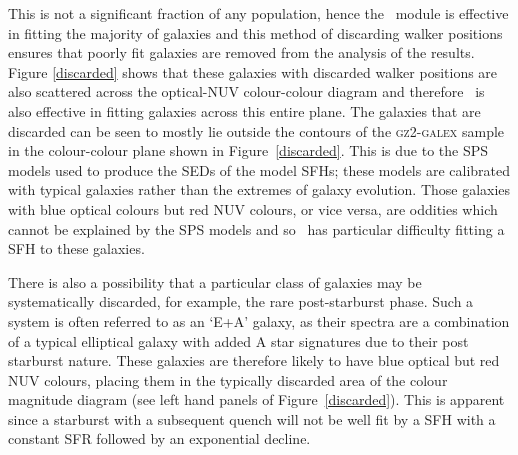 This is not a significant fraction of any population, hence the \starpy~module is effective in fitting the majority of galaxies and this method of discarding walker positions ensures that poorly fit galaxies are removed from the analysis of the results. Figure \ref{discarded} shows that these galaxies with discarded walker positions are also scattered across the optical-NUV colour-colour diagram and therefore \starpy~is also effective in fitting galaxies across this entire plane. The galaxies that are discarded can be seen to mostly lie outside the contours of the \textsc{gz2-galex} sample in the colour-colour plane shown in Figure~\ref{discarded}. This is due to the SPS models used to produce the SEDs of the model SFHs; these models are calibrated with typical galaxies rather than the extremes of galaxy evolution. Those galaxies with blue optical colours but red NUV colours, or vice versa, are oddities which cannot be explained by the SPS models and so \starpy~has particular difficulty fitting a SFH to these galaxies. 

{\minor There is also a possibility that a particular class of galaxies may be systematically discarded, for example, the rare \citep[$<1\%$;][]{Wong12, wild16} post-starburst phase. Such a system is often referred to as an `E+A' galaxy, as their spectra are a combination of a typical elliptical galaxy with added A star signatures due to their post starburst nature. These galaxies are therefore likely to have blue optical but red NUV colours, placing them in the typically discarded area of the colour magnitude diagram (see left hand panels of Figure~\ref{discarded}). This is apparent since a starburst with a subsequent quench will not be well fit by a SFH with a constant SFR followed by an exponential decline.}

